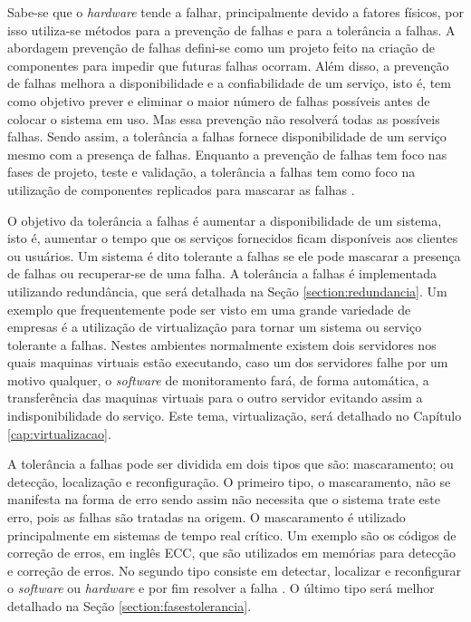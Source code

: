Sabe-se que o \textit{hardware} tende a falhar, principalmente devido a fatores físicos, por isso utiliza-se métodos para a prevenção 
de falhas e para a tolerância a falhas. A abordagem prevenção de falhas defini-se como um projeto feito na criação de componentes para
impedir que futuras falhas ocorram. Além disso, a prevenção de falhas melhora a disponibilidade e a confiabilidade de um serviço, isto é, 
tem como objetivo prever e eliminar o maior número de falhas possíveis antes de colocar o sistema em uso. Mas essa prevenção não resolverá 
todas as possíveis falhas. Sendo assim, a tolerância a falhas fornece disponibilidade de um serviço mesmo com a presença de falhas. 
Enquanto a prevenção de falhas tem foco nas fases de projeto, teste e validação, a tolerância a falhas tem como foco na utilização de 
componentes replicados para mascarar as falhas \cite{pankaj1994}.

O objetivo da tolerância a falhas é aumentar a disponibilidade de um sistema, isto é, aumentar o tempo que os serviços fornecidos ficam 
disponíveis aos clientes ou usuários. Um sistema é dito tolerante a falhas se ele pode mascarar a presença de falhas ou recuperar-se 
de uma falha. A tolerância a falhas é implementada utilizando redundância, que será detalhada na Seção \ref{section:redundancia}. 
Um exemplo que frequentemente pode ser visto em uma grande variedade de empresas é a utilização de virtualização para tornar um sistema ou 
serviço tolerante a falhas. Nestes ambientes normalmente existem dois servidores nos quais maquinas virtuais estão executando, caso um dos 
servidores falhe por um motivo qualquer, o \textit{software} de monitoramento fará, de forma automática, a transferência das maquinas 
virtuais para o outro servidor evitando assim a indisponibilidade do serviço. Este tema, virtualização, será detalhado no 
Capítulo \ref{cap:virtualizacao}.

A tolerância a falhas pode ser dividida em dois tipos que são: mascaramento; ou detecção, localização e reconfiguração.
O primeiro tipo, o mascaramento, não se manifesta na forma de erro sendo assim não necessita que o sistema trate este erro,
pois as falhas são tratadas na origem. O mascaramento é utilizado principalmente em sistemas de tempo real crítico. 
Um exemplo são os códigos de correção de erros, em inglês \ac{ECC}, que são utilizados em memórias para detecção e correção de erros.
No segundo tipo consiste em detectar, localizar e reconfigurar o \textit{software} ou \textit{hardware} e por fim resolver a 
falha \cite{weber2002}. O último tipo será melhor detalhado na Seção \ref{section:fasestolerancia}.

